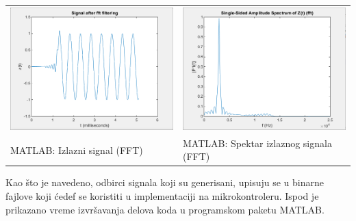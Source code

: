 \documentclass[a4paper,12pt, projekat]{etf}
\begin{document}
\begin{table}[h!]
	\begin{tabular}{ll}
		\includegraphics[scale=0.4]{matlab_fft_filter.png} &
		\includegraphics[scale=0.4]{matlab_fft_filtered.png} \\
		MATLAB: Izlazni signal (FFT) &
		MATLAB: Spektar izlaznog signala (FFT)
	\end{tabular}
\end{table}

Kao \v{s}to je navedeno, odbirci signala koji su generisani, upisuju se u binarne fajlove koji \'{c}edef
se koristiti u implementaciji na mikrokontroleru. Ispod je prikazano vreme izvr\v{s}avanja delova koda u
programskom paketu MATLAB.
\end{document}
